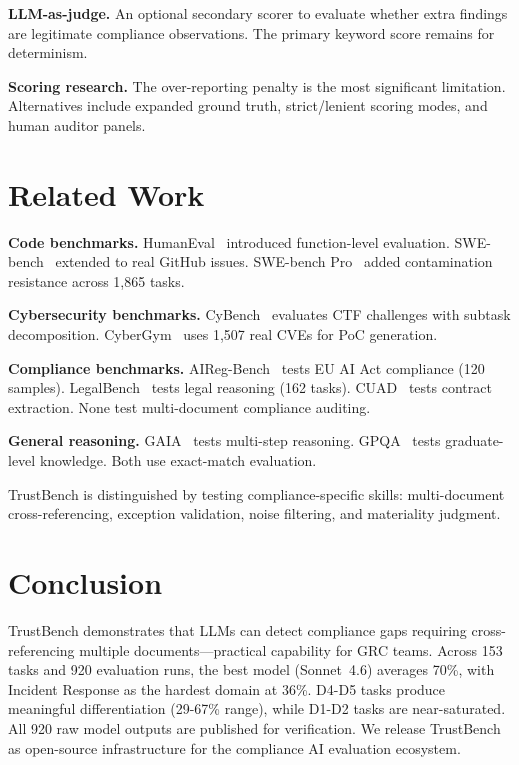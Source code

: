 \documentclass[conference]{IEEEtran}
\begin{document}
\textbf{LLM-as-judge.} An optional secondary scorer to evaluate whether extra findings are legitimate compliance observations. The primary keyword score remains for determinism.

\textbf{Scoring research.} The over-reporting penalty is the most significant limitation. Alternatives include expanded ground truth, strict/lenient scoring modes, and human auditor panels.

\section{Related Work}

\textbf{Code benchmarks.} HumanEval~\cite{humaneval} introduced function-level evaluation. SWE-bench~\cite{swebench} extended to real GitHub issues. SWE-bench Pro~\cite{swebenchpro} added contamination resistance across 1,865 tasks.

\textbf{Cybersecurity benchmarks.} CyBench~\cite{cybench} evaluates CTF challenges with subtask decomposition. CyberGym~\cite{cybergym} uses 1,507 real CVEs for PoC generation.

\textbf{Compliance benchmarks.} AIReg-Bench~\cite{aireg} tests EU AI Act compliance (120 samples). LegalBench~\cite{legalbench} tests legal reasoning (162 tasks). CUAD~\cite{cuad} tests contract extraction. None test multi-document compliance auditing.

\textbf{General reasoning.} GAIA~\cite{gaia} tests multi-step reasoning. GPQA~\cite{gpqa} tests graduate-level knowledge. Both use exact-match evaluation.

TrustBench is distinguished by testing compliance-specific skills: multi-document cross-referencing, exception validation, noise filtering, and materiality judgment.

\section{Conclusion}

TrustBench demonstrates that LLMs can detect compliance gaps requiring cross-referencing multiple documents---practical capability for GRC teams. Across 153 tasks and 920 evaluation runs, the best model (Sonnet~4.6) averages 70\%, with Incident Response as the hardest domain at 36\%. D4-D5 tasks produce meaningful differentiation (29-67\% range), while D1-D2 tasks are near-saturated. All 920 raw model outputs are published for verification. We release TrustBench as open-source infrastructure for the compliance AI evaluation ecosystem.
\end{document}

